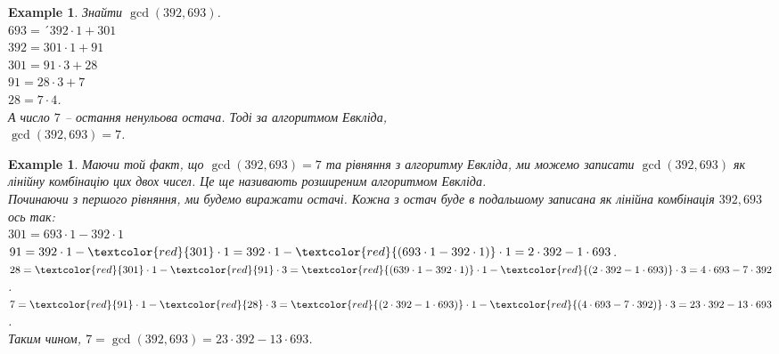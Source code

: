 \documentclass[a4paper, 14pt]{extarticle}
\theoremstyle{theoremdd}
\theoremstyle{theoremdd}
\theoremstyle{theoremdd}
\theoremstyle{theoremdd}
\newtheorem{example}[theorem]{Example}
\theoremstyle{theoremdd}
\theoremstyle{theoremdd}
\theoremstyle{theoremdd}
\theoremstyle{theoremdd}
\begin{document}
\begin{example}
\label{gcd using Euclidean}
Знайти $\gcd(392, 693)$.\\
$693 =´392 \cdot 1 + 301$\\
$392 = 301 \cdot 1 + 91$\\
$301 = 91 \cdot 3 + 28$\\
$91 = 28 \cdot 3 + 7$\\
$28 = 7 \cdot 4$.\\
А число $7$ -- остання ненульова остача. Тоді за алгоритмом Евкліда, \\ $\gcd(392, 693) = 7$.
\end{example}

\begin{example}
\label{gcd as linear combination using Euclidean}
Маючи той факт, що $\gcd(392, 693) = 7$ та рівняння з алгоритму Евкліда, ми можемо записати $\gcd(392, 693)$ як лінійну комбінацію цих двох чисел. Це ще називають розширеним алгоритмом Евкліда.\\
Починаючи з першого рівняння, ми будемо виражати остачі. Кожна з остач буде в подальшому записана як лінійна комбінація $392, 693$ ось так:\\
$301 = 693 \cdot 1 - 392 \cdot 1$\\
$91 = 392 \cdot 1 - \textcolor{red}{301} \cdot 1 = 392 \cdot 1 - \textcolor{red}{(693 \cdot 1 - 392 \cdot 1)} \cdot 1 = 2 \cdot 392 - 1 \cdot 693$.\\
$28 = \textcolor{red}{301} \cdot 1 - \textcolor{red}{91} \cdot 3 = \textcolor{red}{(639 \cdot 1 - 392 \cdot 1)} \cdot 1 - \textcolor{red}{(2 \cdot 392 - 1 \cdot 693)} \cdot 3 = 4 \cdot 693 - 7 \cdot 392$.\\
$7 = \textcolor{red}{91} \cdot 1 - \textcolor{red}{28} \cdot 3 = \textcolor{red}{(2 \cdot 392 - 1 \cdot 693)} \cdot 1 - \textcolor{red}{(4 \cdot 693 - 7 \cdot 392)} \cdot 3 = 23 \cdot 392 - 13 \cdot 693$.\\
Таким чином, $7 = \gcd(392, 693) = 23 \cdot 392 - 13 \cdot 693$.
\end{example}
\end{document}
